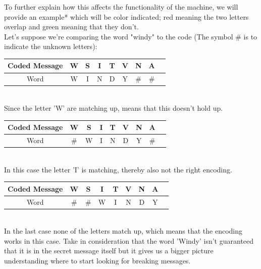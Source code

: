 \documentclass[conference,compsoc]{IEEEtran}
\begin{document}
To further explain how this affects the functionality of the machine, we will provide an example* which will be color indicated; red meaning the two letters overlap and green meaning that they don't.\\
Let's suppose we're comparing the word "windy" to the code (The symbol \# is to indicate the unknown letters):\\

\begin{tabular}{ |c|c|c|c|c|c|c|c|c| }
 \hline
 Coded Message & \cellcolor{red!35}W & S & I & T & V & N & A \\ 
 \hline
 Word & \cellcolor{red!35}W & \cellcolor{green!35}I & \cellcolor{green!35}N & \cellcolor{green!35}D & \cellcolor{green!35}Y & \# & \# \\
 \hline
\end{tabular}\\

Since the letter 'W' are matching up, means that this doesn't hold up.\\

\begin{tabular}{ |c|c|c|c|c|c|c|c|c| }
 \hline
 Coded Message & W & S & \cellcolor{red!35}I & T & V & N & A \\ 
 \hline
 Word & \# & \cellcolor{green!35}W & \cellcolor{red!35}I & \cellcolor{green!35}N & \cellcolor{green!35}D & \cellcolor{green!35}Y & \# \\
 \hline
\end{tabular}\\

In this case the letter 'I' is matching, thereby also not the right encoding.\\

\begin{tabular}{ |c|c|c|c|c|c|c|c|c| }
 \hline
 Coded Message & W & S & I & T & V & N & A \\ 
 \hline
 Word & \# & \# & \cellcolor{green!35}W & \cellcolor{green!35}I & \cellcolor{green!35}N & \cellcolor{green!35}D & \cellcolor{green!35}Y \\
 \hline
\end{tabular}\\


In the last case none of the letters match up, which means that the encoding works in this case. Take in consideration that the word 'Windy' isn't guaranteed that it is in the secret message itself but it gives us a bigger picture understanding where to start looking for breaking messages.\\
\end{document}
